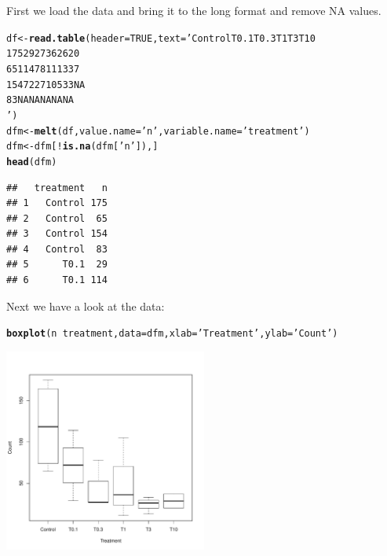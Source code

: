 \documentclass{scrartcl}\usepackage[]{graphicx}\usepackage[]{color}
\makeatletter
\newcommand{\hlnum}[1]{\textcolor[rgb]{0.686,0.059,0.569}{#1}}%
\newcommand{\hlstr}[1]{\textcolor[rgb]{0.192,0.494,0.8}{#1}}%
\newcommand{\hlopt}[1]{\textcolor[rgb]{0,0,0}{#1}}%
\newcommand{\hlstd}[1]{\textcolor[rgb]{0.345,0.345,0.345}{#1}}%
\newcommand{\hlkwb}[1]{\textcolor[rgb]{0.69,0.353,0.396}{#1}}%
\newcommand{\hlkwc}[1]{\textcolor[rgb]{0.333,0.667,0.333}{#1}}%
\newcommand{\hlkwd}[1]{\textcolor[rgb]{0.737,0.353,0.396}{\textbf{#1}}}%
\newenvironment{kframe}{%
 \def\at@end@of@kframe{}%
 \ifinner\ifhmode%
  \def\at@end@of@kframe{\end{minipage}}%
  \begin{minipage}{\columnwidth}%
 \fi\fi%
 \def\FrameCommand##1{\hskip\@totalleftmargin \hskip-\fboxsep
 \colorbox{shadecolor}{##1}\hskip-\fboxsep
     \hskip-\linewidth \hskip-\@totalleftmargin \hskip\columnwidth}%
 \MakeFramed {\advance\hsize-\width
   \@totalleftmargin\z@ \linewidth\hsize
   \@setminipage}}%
 {\par\unskip\endMakeFramed%
 \at@end@of@kframe}
\newenvironment{knitrout}{}{} %
\makeatother
\begin{document}
First we load the data and bring it to the long format and remove NA values.
\begin{knitrout}
\color{fgcolor}\begin{kframe}
\begin{alltt}
\hlstd{df} \hlkwb{<-} \hlkwd{read.table}\hlstd{(}\hlkwc{header} \hlstd{=} \hlnum{TRUE}\hlstd{,} \hlkwc{text} \hlstd{=} \hlstr{'Control  T0.1	T0.3	T1	T3	T10
175	29	27	36	26	20
65	114	78	11	13	37
154	72	27	105	33	NA
83	NA	NA	NA	NA	NA
'}\hlstd{)}
\hlstd{dfm} \hlkwb{<-} \hlkwd{melt}\hlstd{(df,} \hlkwc{value.name} \hlstd{=} \hlstr{'n'}\hlstd{,} \hlkwc{variable.name} \hlstd{=} \hlstr{'treatment'}\hlstd{)}
\hlstd{dfm} \hlkwb{<-} \hlstd{dfm[}\hlopt{!}\hlkwd{is.na}\hlstd{(dfm[}\hlstr{'n'}\hlstd{]), ]}
\hlkwd{head}\hlstd{(dfm)}
\end{alltt}
\begin{verbatim}
##   treatment   n
## 1   Control 175
## 2   Control  65
## 3   Control 154
## 4   Control  83
## 5      T0.1  29
## 6      T0.1 114
\end{verbatim}
\end{kframe}
\end{knitrout}

	
Next we have a look at the data:
\begin{knitrout}
\color{fgcolor}\begin{kframe}
\begin{alltt}
\hlkwd{boxplot}\hlstd{(n} \hlopt{~} \hlstd{treatment,} \hlkwc{data} \hlstd{= dfm,} \hlkwc{xlab} \hlstd{=} \hlstr{'Treatment'}\hlstd{,} \hlkwc{ylab} \hlstd{=} \hlstr{'Count'}\hlstd{)}
\end{alltt}
\end{kframe}
\includegraphics[width=0.5\textwidth]{figure/count_raw_plot} 

\end{knitrout}
\end{document}
